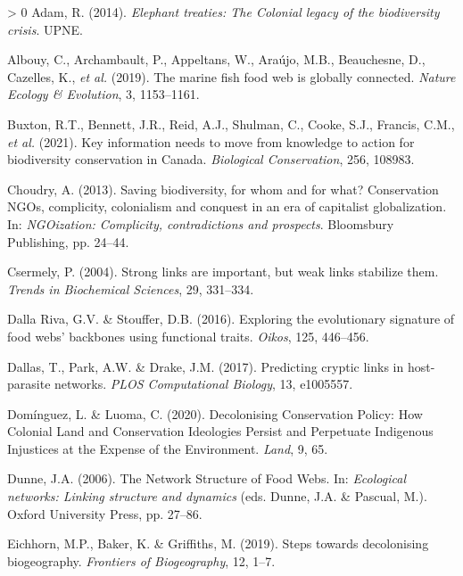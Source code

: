 \documentclass[11pt]{article}
\newlength{\cslhangindent}
\newenvironment{CSLReferences}[3] %
 {%
  \setlength{\parindent}{0pt}
  \ifodd #1 \everypar{\setlength{\hangindent}{\cslhangindent}}\ignorespaces\fi
  \ifnum #2 > 0
  \setlength{\parskip}{#2\baselineskip}
  \fi
 }%
 {}
\begin{document}
\hypertarget{refs}{}
\begin{CSLReferences}{1}{0}
\leavevmode\hypertarget{ref-Adam2014EleTre}{}%
Adam, R. (2014). \emph{Elephant treaties: The Colonial legacy of the
biodiversity crisis}. UPNE.

\leavevmode\hypertarget{ref-Albouy2019MarFis}{}%
Albouy, C., Archambault, P., Appeltans, W., Araújo, M.B., Beauchesne,
D., Cazelles, K., \emph{et al.} (2019). The marine fish food web is
globally connected. \emph{Nature Ecology \& Evolution}, 3, 1153--1161.

\leavevmode\hypertarget{ref-Buxton2021KeyInf}{}%
Buxton, R.T., Bennett, J.R., Reid, A.J., Shulman, C., Cooke, S.J.,
Francis, C.M., \emph{et al.} (2021). Key information needs to move from
knowledge to action for biodiversity conservation in Canada.
\emph{Biological Conservation}, 256, 108983.

\leavevmode\hypertarget{ref-Choudry2013SavBio}{}%
Choudry, A. (2013). Saving biodiversity, for whom and for what?
Conservation NGOs, complicity, colonialism and conquest in an era of
capitalist globalization. In: \emph{NGOization: Complicity,
contradictions and prospects}. Bloomsbury Publishing, pp. 24--44.

\leavevmode\hypertarget{ref-Csermely2004StrLin}{}%
Csermely, P. (2004). Strong links are important, but weak links
stabilize them. \emph{Trends in Biochemical Sciences}, 29, 331--334.

\leavevmode\hypertarget{ref-DallaRiva2016ExpEvo}{}%
Dalla Riva, G.V. \& Stouffer, D.B. (2016). Exploring the evolutionary
signature of food webs' backbones using functional traits. \emph{Oikos},
125, 446--456.

\leavevmode\hypertarget{ref-Dallas2017PreCry}{}%
Dallas, T., Park, A.W. \& Drake, J.M. (2017). Predicting cryptic links
in host-parasite networks. \emph{PLOS Computational Biology}, 13,
e1005557.

\leavevmode\hypertarget{ref-Dominguez2020DecCon}{}%
Domínguez, L. \& Luoma, C. (2020). Decolonising Conservation Policy: How
Colonial Land and Conservation Ideologies Persist and Perpetuate
Indigenous Injustices at the Expense of the Environment. \emph{Land}, 9,
65.

\leavevmode\hypertarget{ref-Dunne2006NetStr}{}%
Dunne, J.A. (2006). The Network Structure of Food Webs. In:
\emph{Ecological networks: Linking structure and dynamics} (eds. Dunne,
J.A. \& Pascual, M.). Oxford University Press, pp. 27--86.

\leavevmode\hypertarget{ref-Eichhorn2019SteDec}{}%
Eichhorn, M.P., Baker, K. \& Griffiths, M. (2019). Steps towards
decolonising biogeography. \emph{Frontiers of Biogeography}, 12, 1--7.


\end{CSLReferences}
\end{document}
